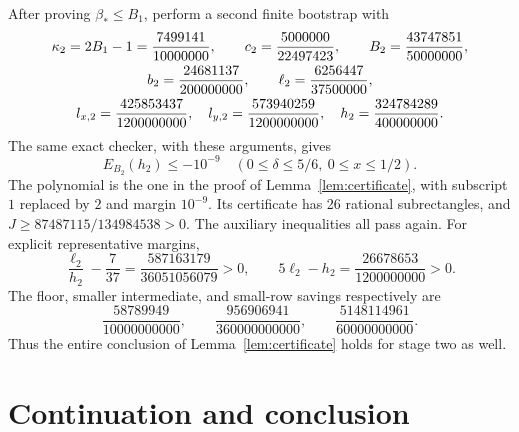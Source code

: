 \documentclass[11pt]{article}
\newcommand{\Bstar}{\beta_*}
\begin{document}
After proving $\Bstar\le B_1$, perform a second finite bootstrap with
\begin{gather}\label{eq:stage2}
 \kappa_2=2B_1-1=\frac{7499141}{10000000},\qquad
 c_2=\frac{5000000}{22497423},\qquad
 B_2=\frac{43747851}{50000000},\\
 b_2=\frac{24681137}{200000000},\qquad
 \ell_2=\frac{6256447}{37500000},\notag\\
 l_{x,2}=\frac{425853437}{1200000000},\quad
 l_{y,2}=\frac{573940259}{1200000000},\quad
 h_2=\frac{324784289}{400000000}.\notag
\end{gather}
The same exact checker, with these arguments, gives
\begin{equation}\label{eq:stage2-endpoint}
 E_{B_2}(h_2)\le-10^{-9}
 \quad(0\le\delta\le5/6,\ 0\le x\le1/2).
\end{equation}
The polynomial is the one in the proof of Lemma~\ref{lem:certificate},
with subscript $1$ replaced by $2$ and margin $10^{-9}$. Its certificate
has 26 rational subrectangles, and
$J\ge87487115/134984538>0$. The auxiliary inequalities all pass again.
For explicit representative margins,
\[
 \frac{\ell_2}{h_2}-\frac7{37}=\frac{587163179}{36051056079}>0,
 \qquad5\ell_2-h_2=\frac{26678653}{1200000000}>0.
\]
The floor, smaller intermediate, and small-row savings respectively are
\[
 \frac{58789949}{10000000000},\qquad
 \frac{956906941}{360000000000},\qquad
 \frac{5148114961}{60000000000}.
\]
Thus the entire conclusion of
Lemma~\ref{lem:certificate} holds for stage two as well.

\section{Continuation and conclusion}
\end{document}
